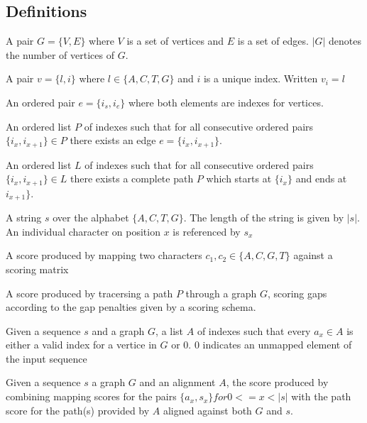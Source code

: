 \documentclass[thesis.tex]{subfiles}
\begin{document}
\subsection{Definitions}
\begin{defn}
	A pair $G=\{V,E\}$ where $V$ is a set of vertices and $E$ is a set of edges. $|G|$ denotes the number of vertices of $G$.
\end{defn}
\begin{defn}[Vertice]
	A pair $v=\{l, i\}$ where $l \in \{A, C, T, G\}$ and $i$ is a unique index. Written $v_i=l$
\end{defn}
\begin{defn}[Edge]
	An ordered pair $e=\{i_s, i_e\}$ where both elements are indexes for vertices. 
\end{defn}
\begin{defn}
	An ordered list $P$ of indexes such that for all consecutive ordered pairs $\{i_x, i_{x+1}\} \in P$ there exists an edge $e=\{i_x, i_{x+1}\}$.
\end{defn}
\begin{defn}[Path]
	An ordered list $L$ of indexes such that for all consecutive ordered pairs $\{i_x, i_{x+1}\} \in L$ there exists a complete path $P$ which starts at $\{i_x\}$ and ends at $i_{x+1}\}$.
\end{defn}
\begin{defn}
	A string $s$ over the alphabet $\{A, C, T, G\}$. The length of the string is given by $|s|$. An individual character on position $x$ is referenced by $s_x$
\end{defn}
\begin{defn}
	A score produced by mapping two characters $c_1, c_2 \in \{A, C, G, T\}$ against a scoring matrix
\end{defn}
\begin{defn}
	A score produced by tracersing a path $P$ through a graph $G$, scoring gaps according to the gap penalties given by a scoring schema.
\end{defn}
\begin{defn}[Alignment]
	Given a sequence $s$ and a graph $G$, a list $A$ of indexes such that every $a_x \in A$ is either a valid index for a vertice in $G$ or $0$. $0$ indicates an unmapped element of the input sequence
\end{defn}
\begin{defn}
	Given a sequence $s$ a graph $G$ and an alignment $A$, the score produced by combining mapping scores for the pairs $\{a_x, s_x\} for 0<=x<|s|$ with the path score for the path(s) provided by $A$ aligned against both $G$ and $s$.
\end{defn}
\end{document}
